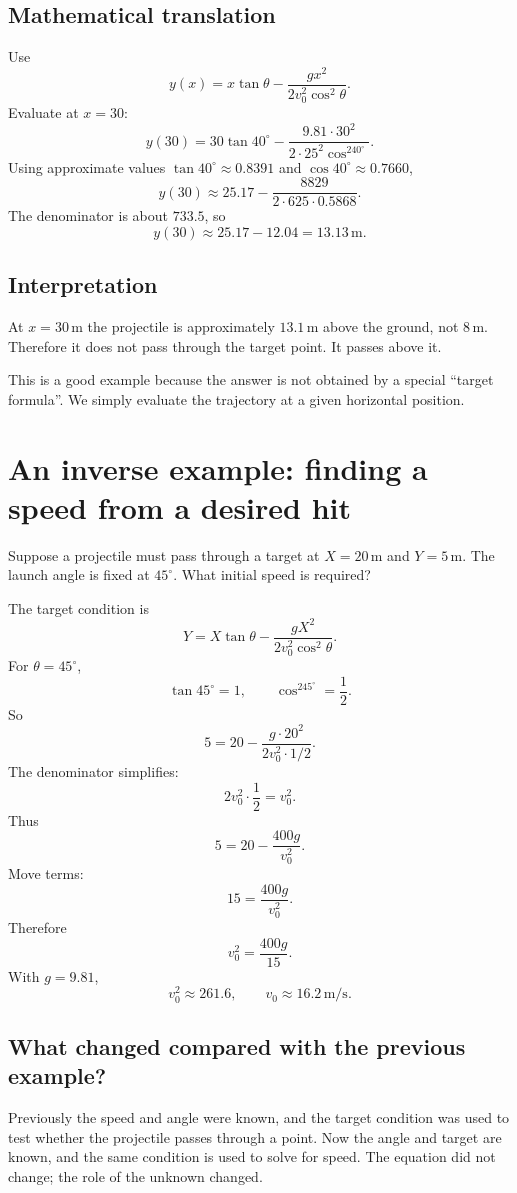 \documentclass[11pt,a4paper]{article}
\begin{document}
\subsection{Mathematical translation}

Use
\[
y(x)=x\tan\theta-\frac{gx^2}{2v_0^2\cos^2\theta}.
\]
Evaluate at $x=30$:
\[
y(30)=30\tan40^\circ-\frac{9.81\cdot30^2}{2\cdot25^2\cos^240^\circ}.
\]
Using approximate values $\tan40^\circ\approx0.8391$ and $\cos40^\circ\approx0.7660$,
\[
y(30)\approx25.17-\frac{8829}{2\cdot625\cdot0.5868}.
\]
The denominator is about $733.5$, so
\[
y(30)\approx25.17-12.04=13.13\,\mathrm{m}.
\]

\subsection{Interpretation}

At $x=30\,\mathrm{m}$ the projectile is approximately $13.1\,\mathrm{m}$ above the ground, not $8\,\mathrm{m}$. Therefore it does not pass through the target point. It passes above it.

This is a good example because the answer is not obtained by a special ``target formula''. We simply evaluate the trajectory at a given horizontal position.

\section{An inverse example: finding a speed from a desired hit}

Suppose a projectile must pass through a target at $X=20\,\mathrm{m}$ and $Y=5\,\mathrm{m}$. The launch angle is fixed at $45^\circ$. What initial speed is required?

The target condition is
\[
Y=X\tan\theta-\frac{gX^2}{2v_0^2\cos^2\theta}.
\]
For $\theta=45^\circ$,
\[
\tan45^\circ=1,
\qquad
\cos^245^\circ=\frac12.
\]
So
\[
5=20-\frac{g\cdot20^2}{2v_0^2\cdot1/2}.
\]
The denominator simplifies:
\[
2v_0^2\cdot\frac12=v_0^2.
\]
Thus
\[
5=20-\frac{400g}{v_0^2}.
\]
Move terms:
\[
15=\frac{400g}{v_0^2}.
\]
Therefore
\[
v_0^2=\frac{400g}{15}.
\]
With $g=9.81$,
\[
v_0^2\approx261.6,
\qquad
v_0\approx16.2\,\mathrm{m/s}.
\]

\subsection{What changed compared with the previous example?}

Previously the speed and angle were known, and the target condition was used to test whether the projectile passes through a point. Now the angle and target are known, and the same condition is used to solve for speed. The equation did not change; the role of the unknown changed.
\end{document}
